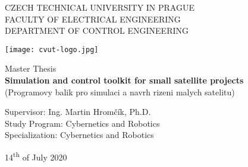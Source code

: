 \begin{titlepage}
    \centering

    {\Large CZECH TECHNICAL UNIVERSITY IN PRAGUE}\\[0.3cm]
    {\large FACULTY OF ELECTRICAL ENGINEERING}\\[0.3cm]
    {\large DEPARTMENT OF CONTROL ENGINEERING}\\

    \vfill

    \texttt{[image: cvut-logo.jpg]}\\

    \vfill

    {\Large Master Thesis}\\[0.3cm]
    {\huge \textbf{Simulation and control toolkit for small satellite projects}}\\[0.3cm]
    {\Large(Programovy balik pro simulaci a navrh rizeni malych satelitu)}\\

    \vfill

    Supervisor: Ing. Martin Hromčík, Ph.D.\\[0.6cm]  
    Study Program: Cybernetics and Robotics\\[0.2cm]  
    Specialization: Cybernetics and Robotics\\

    \vfill

    14\textsuperscript{th} of July 2020
\end{titlepage}
